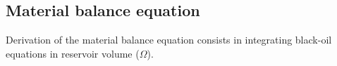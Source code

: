 \documentclass[authoryear,preprint,review,11pt]{elsarticle}
\begin{document}
\subsection{Material balance equation}

Derivation of the material balance equation consists in integrating black-oil equations in reservoir volume ($\Omega$).


\end{document}
